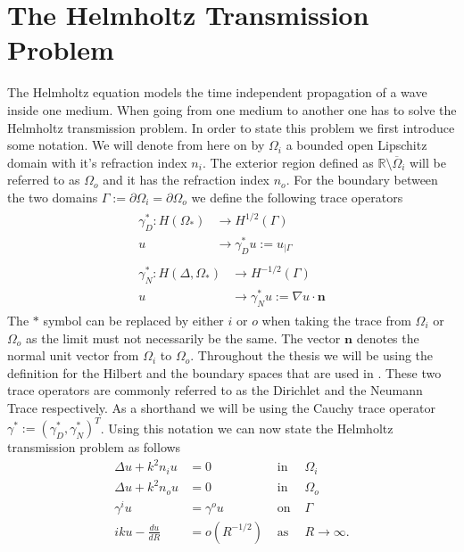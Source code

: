 \documentclass[a4paper, oneside]{thirdparty_stylesheets/discothesis}
\begin{document}
\section{The Helmholtz Transmission Problem}
The Helmholtz equation models the time independent propagation of a wave inside one medium.
When going from one medium to another one has to solve the Helmholtz transmission problem.
In order to state this problem we first introduce some notation.
We will denote from here on by $\Omega_i$ a bounded open Lipschitz domain with it's refraction index $n_i$.
The exterior region defined as $\mathbb{R} \setminus \overline{\Omega}_i$ will be referred to as $\Omega_o$ and it has the refraction index $n_o$.
For the boundary between the two domains $\Gamma := \partial\Omega_i = \partial\Omega_o$ we define the following trace operators
\begin{align}
	\begin{split}
		\gamma_D^*: H(\Omega_*) &\longrightarrow H^{1/2}(\Gamma) \\
		u &\longrightarrow \gamma_D^*u := u_{|\Gamma} 
	\end{split}
	\\
	\begin{split}
		\gamma_N^*: H(\Delta,\Omega_*) &\longrightarrow H^{-1/2}(\Gamma) \\
		u &\longrightarrow \gamma_N^*u := \nabla u \cdot \mathbf{n}
	\end{split}
\end{align}
The $*$ symbol can be replaced by either $i$ or $o$ when taking the trace from $\Omega_i$ or $\Omega_o$ as the limit must not necessarily be the same. The vector $\mathbf{n}$ denotes the normal unit vector from $\Omega_i$ to $\Omega_o$. 
Throughout the thesis we will be using the definition for the Hilbert and the boundary spaces that are used in \cite{anmcse}.
These two trace operators are commonly referred to as the Dirichlet and the Neumann Trace respectively.
As a shorthand we will be using the Cauchy trace operator $\gamma^* := (\gamma_D^*, \gamma_N^*)^T$.
Using this notation we can now state the Helmholtz transmission problem as follows
\begin{align}
	\Delta u + k^2n_iu &= 0 & \text{ in }& \Omega_i \\
	\Delta u + k^2n_ou &= 0 & \text{ in }& \Omega_o \\
	\gamma^iu &= \gamma^ou & \text{ on }& \Gamma \\
	iku - \frac{du}{dR} &= o(R^{-1/2}) & \text{ as }& R \rightarrow \infty \label{sfrc}.
\end{align}
\end{document}
